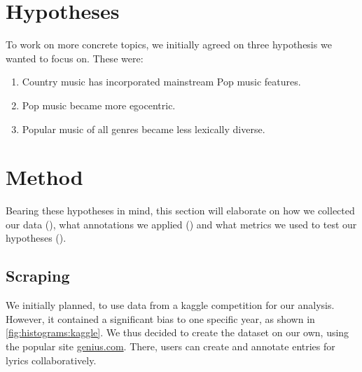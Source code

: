 \documentclass[11pt,a4paper]{article}
\begin{document}
\section{Hypotheses}\label{sec:hypotheses}

To work on more concrete topics, we initially agreed on three hypothesis we wanted to focus on. These were:

\begin{enumerate}[$H_1$]
	\item \label{hypo:country} Country music has incorporated mainstream Pop music features.
	\item \label{hypo:ego} Pop music became more egocentric. 
	\item \label{hypo:lexical} Popular music of all genres became less lexically diverse. 
	
\end{enumerate}


\section{Method}\label{sec:method}

Bearing these hypotheses in mind, this section will elaborate on how we collected our data (), what annotations we applied () and what metrics we used to test our hypotheses (). 
\subsection{Scraping}\label{sec:scraping}

We initially planned, to use data from a kaggle competition \citep{kuznetsov_55000+_2017} for our analysis. However, it contained a significant bias to one specific year, as shown in \cref{fig:histograms:kaggle}. We thus decided to create the dataset on our own, using the popular site \url{genius.com}. There, users can create and annotate entries for lyrics collaboratively.
\end{document}
